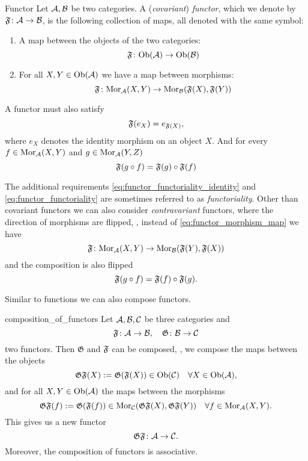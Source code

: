 \begin{definition}{Functor \cite[Sec.~1.3]{Roman2017}}{}
Let $\mathcal{A}, \mathcal{B}$ be two categories. A (\emph{covariant}) \emph{functor}, which we denote by $\mathfrak{F}\colon \mathcal{A} \to \mathcal{B}$, is the following collection of maps, all denoted with the same symbol:
\begin{enumerate}
    \item A map between the objects of the two categories:
    \begin{equation*}
    \mathfrak{F}\colon \mathrm {Ob}(\mathcal{A}) \to \mathrm {Ob}(\mathcal{B})
    \end{equation*}
    \item For all $X,Y \in \mathrm {Ob}(\mathcal{A})$ we have a map between morphisms: 
    \begin{equation}
    \label{eq:functor_morphism_map}
    \mathfrak{F}\colon \mathrm {Mor}_{\mathcal{A}}(X,Y) \to \mathrm {Mor}_{\mathcal{B}}(\mathfrak{F}(X), \mathfrak{F}(Y))
    \end{equation}
\end{enumerate}
A functor must also satisfy
\begin{equation}
\label{eq:functor_functoriality_identity}
\mathfrak{F}(e_X) = e_{\mathfrak{F}(X)},
\end{equation}
where $e_X$ denotes the identity morphism on an object $X$. And for every ${f \in \mathrm {Mor}_{\mathcal{A}}(X,Y)}$ and $g \in \mathrm {Mor}_{\mathcal{A}}(Y,Z)$
\begin{equation}
\label{eq:functor_functoriality}
\mathfrak{F}(g \circ f) = \mathfrak{F}(g) \circ \mathfrak{F}(f)
\end{equation}
\end{definition}

The additional requirements \eqref{eq:functor_functoriality_identity} and \eqref{eq:functor_functoriality} are sometimes referred to as \emph{functoriality}. Other than covariant functors we can also consider \emph{contravariant} functors, where the direction of morphisms are flipped, \ie, instead of \eqref{eq:functor_morphism_map} we have
$$
\mathfrak{F}\colon \mathrm {Mor}_{\mathcal{A}}(X,Y) \to \mathrm {Mor}_{\mathcal{B}}(\mathfrak{F}(Y), \mathfrak{F}(X))
$$
and the composition is also flipped
$$
\mathfrak{F}(g \circ f) = \mathfrak{F}(f) \circ \mathfrak{F}(g).
$$

Similar to functions we can also compose functors.

\begin{defprop}{\cite[Sec.~1.3.1]{Roman2017}}{composition_of_functors}
Let $\mathcal{A}, \mathcal{B}, \mathcal{C}$ be three categories and
$$
\mathfrak{F}\colon \mathcal{A} \to \mathcal{B}, \quad \mathfrak{G}\colon \mathcal{B} \to \mathcal{C}
$$
two functors. Then $\mathfrak{G}$ and $\mathfrak{F}$ can be composed, \ie, we compose the maps between the objects 
$$
\mathfrak{G} \mathfrak{F} (X) := \mathfrak{G}(\mathfrak{F}(X)) \in \mathrm {Ob}(\mathcal{C}) \quad \forall X \in \mathrm {Ob}(\mathcal{A}),
$$
and for all $X,Y \in \mathrm {Ob}(\mathcal{A})$ the maps between the morphisms
$$
\mathfrak{G} \mathfrak{F} (f) := \mathfrak{G}(\mathfrak{F}(f)) \in \mathrm {Mor}_{\mathcal{C}}(\mathfrak{G} \mathfrak{F} (X), \mathfrak{G} \mathfrak{F} (Y)) \quad \forall f \in \mathrm {Mor}_{\mathcal{A}}(X,Y).
$$
This gives us a new functor
$$
\mathfrak{G} \mathfrak{F}\colon \mathcal{A} \to \mathcal{C}.
$$
Moreover, the composition of functors is associative.
\end{defprop}

